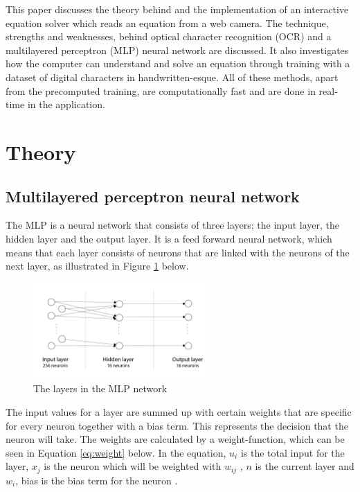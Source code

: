 \documentclass[12pt]{report}
\begin{document}
This paper discusses the theory behind and the implementation of an interactive equation solver which reads an equation from a web camera. The technique, strengths and weaknesses, behind optical character recognition (OCR) and a multilayered perceptron (MLP) neural network are discussed. It also investigates how the computer can understand and solve an equation through training with a  dataset of digital characters in handwritten-esque. All of these methods, apart from the precomputed training, are computationally fast and are done in real-time in the application.



\section*{Theory}

\subsection*{Multilayered perceptron neural network}

The MLP is a neural network that consists of three layers; the input layer, the hidden layer and the output layer.  It is a feed forward neural network, which means that each layer consists of neurons that are linked with the neurons of the next layer, as illustrated in Figure \ref{fig:layers} below.

\begin{figure}[!ht]
	\centering
	\includegraphics[width=0.6\textwidth]{Images/mlp_layers.png}
	\caption{\label{fig:layers} The layers in the MLP network}
	\centering
\end{figure}
The input values for a layer are summed up with certain weights that are specific for every neuron together with a bias term. This represents the decision that the neuron will take. The weights are calculated by a weight-function, which can be seen in Equation \ref{eq:weight} below. In the equation, $u_i$ is the total input for the layer, $x_j$  is the neuron which will be weighted with $w_{ij}$ , $n$ is the current layer and  $w_i$, bias is the bias term for the neuron \cite{mlp}. 
\end{document}
